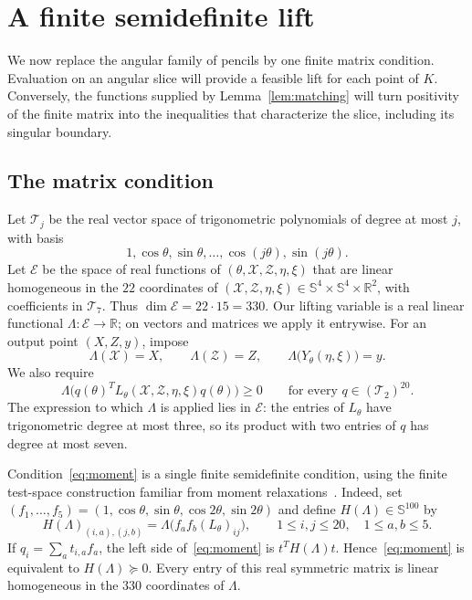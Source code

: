 \section{A finite semidefinite lift}\label{sec:lift}

We now replace the angular family of pencils by one finite matrix condition.
Evaluation on an angular slice will provide a feasible lift for each point of
$K$.  Conversely, the functions supplied by Lemma~\ref{lem:matching} will
turn positivity of the finite matrix into the inequalities that characterize
the slice, including its singular boundary.

\subsection{The matrix condition}

Let $\mathcal T_j$ be the real vector space of trigonometric polynomials of
degree at most $j$, with basis
\[
  1,\cos\theta,\sin\theta,\ldots,\cos(j\theta),\sin(j\theta).
\]
Let $\mathcal E$ be the space of real functions of
$(\theta,\mathcal X,\mathcal Z,\eta,\xi)$ that are linear homogeneous in
the $22$ coordinates of
$(\mathcal X,\mathcal Z,\eta,\xi)\in
\mathbb S^4\times\mathbb S^4\times\mathbb R^2$, with coefficients in
$\mathcal T_7$.  Thus $\dim\mathcal E=22\cdot15=330$.
Our lifting variable is a real linear functional
$\Lambda:\mathcal E\to\mathbb R$; on vectors and matrices we apply it
entrywise.  For an output point $(X,Z,y)$, impose
\begin{equation}\label{eq:output}
  \Lambda(\mathcal X)=X,\qquad
  \Lambda(\mathcal Z)=Z,\qquad
  \Lambda\bigl(Y_\theta(\eta,\xi)\bigr)=y.
\end{equation}
We also require
\begin{equation}\label{eq:moment}
  \Lambda\bigl(q(\theta)^T
  L_\theta(\mathcal X,\mathcal Z,\eta,\xi)q(\theta)\bigr)\geq0
  \qquad\text{for every }q\in(\mathcal T_2)^{20}.
\end{equation}
The expression to which $\Lambda$ is applied lies in $\mathcal E$:
the entries of $L_\theta$ have trigonometric degree at most three, so its
product with two entries of $q$ has degree at most seven.

Condition~\eqref{eq:moment} is a single finite semidefinite condition,
using the finite test-space construction familiar from moment
relaxations~\cite{lasserre2001,lasserre2009}.
Indeed, set $(f_1,\ldots,f_5)=
(1,\cos\theta,\sin\theta,\cos2\theta,\sin2\theta)$ and define
$H(\Lambda)\in\mathbb S^{100}$ by
\begin{equation}\label{eq:moment-matrix}
  H(\Lambda)_{(i,a),(j,b)}
    =\Lambda\bigl(f_a f_b (L_\theta)_{ij}\bigr),
  \qquad 1\leq i,j\leq20,\quad 1\leq a,b\leq5.
\end{equation}
If $q_i=\sum_a t_{i,a}f_a$, the left side of~\eqref{eq:moment} is
$t^TH(\Lambda)t$.  Hence~\eqref{eq:moment} is equivalent to
$H(\Lambda)\succeq0$.  Every entry of this real symmetric matrix is linear
homogeneous in the $330$ coordinates of $\Lambda$.

